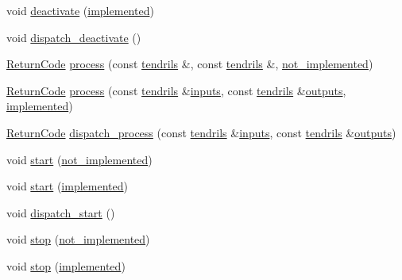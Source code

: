 \begin{DoxyCompactItemize}
\item 
void \hyperlink{structecto_1_1cell___ab0dc3bd8a6bf42f620a654134df831d3}{deactivate} (\hyperlink{structecto_1_1cell___a63c5c3dd95630a508017730ee345c23a}{implemented})
\item 
void \hyperlink{structecto_1_1cell___a71463eb5e248d29814066904e7f0d515}{dispatch\-\_\-deactivate} ()
\item 
\hyperlink{namespaceecto_a93d82cd28db695d53963fb696582762c}{Return\-Code} \hyperlink{structecto_1_1cell___aeb9a98d085805631cc3a3b09c277d5be}{process} (const \hyperlink{classecto_1_1tendrils}{tendrils} \&, const \hyperlink{classecto_1_1tendrils}{tendrils} \&, \hyperlink{structecto_1_1cell___a3e48e52421d132bb2bb4e343f771abeb}{not\-\_\-implemented})
\item 
\hyperlink{namespaceecto_a93d82cd28db695d53963fb696582762c}{Return\-Code} \hyperlink{structecto_1_1cell___a310050d75c3a286f013fa16652af6e17}{process} (const \hyperlink{classecto_1_1tendrils}{tendrils} \&\hyperlink{structecto_1_1cell_a65099b0458a7761b8bfa7a1ddc17e92f}{inputs}, const \hyperlink{classecto_1_1tendrils}{tendrils} \&\hyperlink{structecto_1_1cell_a93951743b603faba35312ebdb07ceb22}{outputs}, \hyperlink{structecto_1_1cell___a63c5c3dd95630a508017730ee345c23a}{implemented})
\item 
\hyperlink{namespaceecto_a93d82cd28db695d53963fb696582762c}{Return\-Code} \hyperlink{structecto_1_1cell___a1ddd0142b998f0de06a7992c5db27f16}{dispatch\-\_\-process} (const \hyperlink{classecto_1_1tendrils}{tendrils} \&\hyperlink{structecto_1_1cell_a65099b0458a7761b8bfa7a1ddc17e92f}{inputs}, const \hyperlink{classecto_1_1tendrils}{tendrils} \&\hyperlink{structecto_1_1cell_a93951743b603faba35312ebdb07ceb22}{outputs})
\item 
void \hyperlink{structecto_1_1cell___a155401641b4deda52ad3eb8277a9d77d}{start} (\hyperlink{structecto_1_1cell___a3e48e52421d132bb2bb4e343f771abeb}{not\-\_\-implemented})
\item 
void \hyperlink{structecto_1_1cell___afbca5bafc2261f303413fd431f0b12b6}{start} (\hyperlink{structecto_1_1cell___a63c5c3dd95630a508017730ee345c23a}{implemented})
\item 
void \hyperlink{structecto_1_1cell___af6929fe6c16db59235793d972ea20ff8}{dispatch\-\_\-start} ()
\item 
void \hyperlink{structecto_1_1cell___a689e109200f31da6edb491e28b101622}{stop} (\hyperlink{structecto_1_1cell___a3e48e52421d132bb2bb4e343f771abeb}{not\-\_\-implemented})
\item 
void \hyperlink{structecto_1_1cell___ac6da640a23124d5a154884cc6e45531c}{stop} (\hyperlink{structecto_1_1cell___a63c5c3dd95630a508017730ee345c23a}{implemented})

\end{DoxyCompactItemize}
